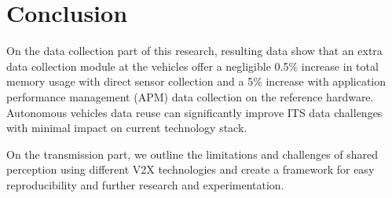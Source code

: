 \chapter{Conclusion}

On the data collection part of this research, resulting data show that an extra data collection module at the vehicles offer a negligible 0.5\% increase in total memory usage  with direct sensor collection and a 5\% increase with application performance management (APM) data collection on the reference hardware. Autonomous vehicles data reuse can significantly improve ITS data challenges with minimal impact on current technology stack.

On the transmission part, we outline the limitations and challenges of shared perception using different V2X technologies and create a framework for easy reproducibility and further research and experimentation.
